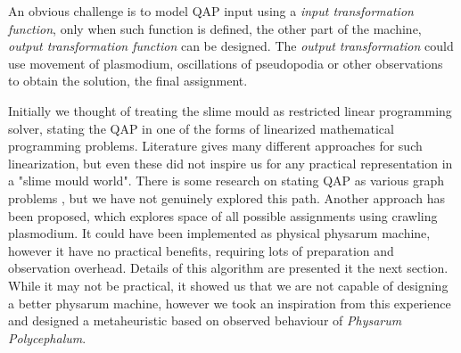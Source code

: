 An obvious challenge is to model QAP input using a \textit{input transformation function}, only when such function is defined, the other part of the machine, \textit{output transformation function} can be designed. The \textit{output transformation} could use movement of plasmodium, oscillations of pseudopodia or other observations to obtain the solution, the final assignment.

Initially we thought of treating the slime mould as restricted linear programming solver, stating the QAP in one of the forms of linearized mathematical programming problems. Literature gives many different approaches for such linearization, but even these did not inspire us for any practical representation in a "slime mould world". There is some research on stating QAP as various graph problems \cite{cela2013quadratic}, but we have not genuinely explored this path. Another approach has been proposed, which explores space of all possible assignments using crawling plasmodium. It could have been implemented as physical physarum machine, however it have no practical benefits, requiring lots of preparation and observation overhead. Details of this algorithm are presented it the next section. While it may not be practical, it showed us that we are not capable of designing a better physarum machine, however we took an inspiration from this experience and designed a metaheuristic based on observed behaviour of \textit{Physarum Polycephalum}.





